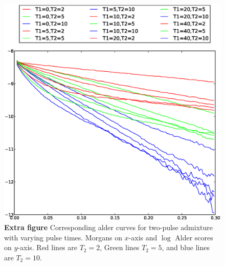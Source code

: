 


\begin{figure}
\includegraphics[scale=.6]{alder_Ts.eps}
\caption{
{\bf Extra figure} Corresponding alder curves for two-pulse admixture with varying pulse times. Morgans on $x$-axis and $\log$ Alder scores on $y$-axis. Red lines are $T_2=2$, Green lines $T_2=5$, and blue lines are $T_2=10$.
}
\end{figure}

